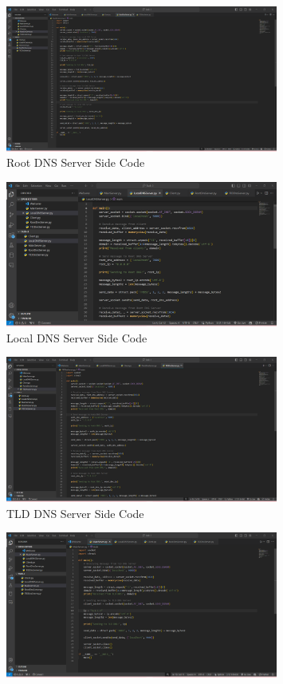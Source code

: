 \documentclass[11pt]{article}
\begin{document}
\begin{itemize}
\begin{itemize}
    \begin{figure}[H]
        \centering
        \includegraphics[width=0.8\textwidth]{RootDNSServer.png}
        \caption{Root DNS Server Side Code}
        \label{fig:2}
    \end{figure}
    \begin{figure}[H]
        \centering
        \includegraphics[width=0.8\textwidth]{LocalDNSServer.png}
        \caption{Local DNS Server Side Code}
        \label{fig:2}
    \end{figure}
    \begin{figure}[H]
        \centering
        \includegraphics[width=0.8\textwidth]{TlDDNSServer.png}
        \caption{TLD DNS Server Side Code}
        \label{fig:2}
    \end{figure}
    \begin{figure}[H]
        \centering
        \includegraphics[width=0.8\textwidth]{MainServer.png}

\end{figure}
\end{itemize}
\end{itemize}
\end{document}
